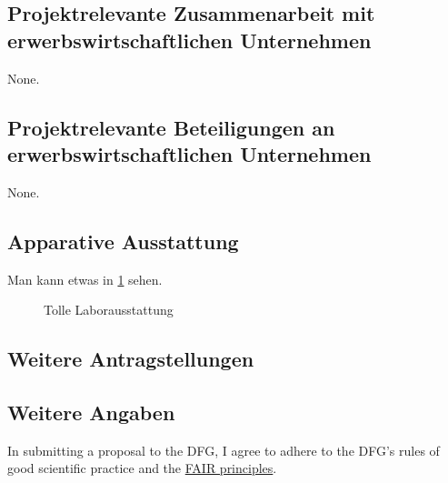 \documentclass[ngerman]{scrartcl}
\begin{document}
\subsection{Projektrelevante Zusammenarbeit mit erwerbswirtschaftlichen Unternehmen}
None.

\subsection{Projektrelevante Beteiligungen an erwerbswirtschaftlichen Unternehmen}
None.

\subsection{Apparative Ausstattung}
Man kann etwas in \cref{fig:some_nice_graph} sehen.
\begin{figure}
\centering
{}
\caption{Tolle Laborausstattung}
\label{fig:some_nice_graph}
\end{figure}

\subsection{Weitere Antragstellungen}

\subsection{Weitere Angaben}
In submitting a proposal to the DFG, I agree to adhere to the DFG's rules of good scientific practice and the \href{https://www.nature.com/articles/sdata201618}{FAIR principles}.

\end{document}

